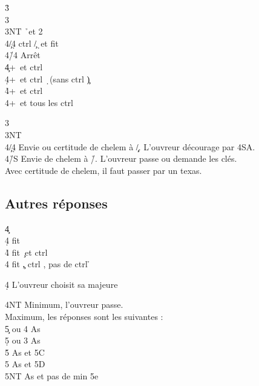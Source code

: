 \documentclass[a4paper]{article}
\begin{document}
\begin{bidtable}
3\h\+\\
3\s {}\s \\
3NT \h\ et 2\s \+\\
4\c/4\d \> ctrl \c /\d\ et fit \h \\
4\h/4\s \> Arrêt\-\\
4\c {}+\s\ et ctrl \c \\
4\d {}+\s\ et ctrl \d\ (sans ctrl \c )\\
4\h {}+\s\ et ctrl \h \\
4\s {}+\s\ et tous les ctrl\-
\end{bidtable}

\begin{bidtable}
3\s\+\\
3NT\+\\
4\c/4\d \> Envie ou certitude de chelem à \c /\d . L'ouvreur décourage par 4SA.\\
4\h/S \> Envie de chelem à \h /\s . L'ouvreur passe ou demande les clés.\\
\>Avec certitude de chelem, il faut passer par un texas.\-\-
\end{bidtable}

\subsection{Autres réponses}

\begin{bidtable}
4\c\+\\
4\d \> fit \d \\
4\h \> fit \c\ et ctrl \h \\
4\s \> fit \c , ctrl \s , pas de ctrl \h \-
\end{bidtable}

\begin{bidtable}
4\d \> L'ouvreur choisit sa majeure
\end{bidtable}

\begin{bidtable}
4NT \> Minimum, l'ouvreur passe.\\
\>Maximum, les réponses sont les suivantes :\+\\
5\c {} ou 4 As\\
5\d {} ou 3 As\\
5\h {} As et 5C\\
5\s {} As et 5D\\
5NT  As et pas de min 5e\-
\end{bidtable}
\end{document}
